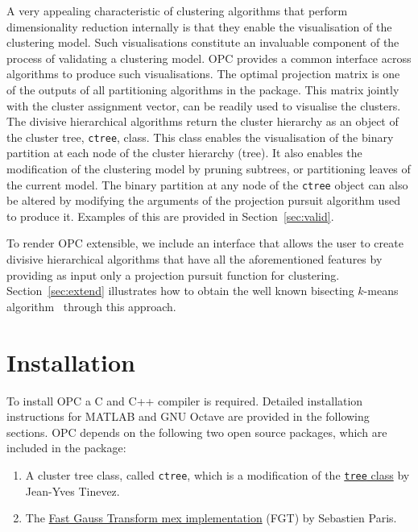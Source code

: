 \documentclass{book}
\begin{document}
A very appealing characteristic of clustering algorithms that perform
dimensionality reduction internally is that they enable the visualisation of
the clustering model. 
%
Such visualisations constitute an invaluable component of the process of
validating a clustering model.  OPC provides a common interface across
algorithms to produce such visualisations.
%
The optimal
projection matrix is one of the outputs of all partitioning algorithms in the
package. This matrix jointly with the cluster assignment vector, can be readily
used to visualise the clusters.
%
The divisive hierarchical algorithms return the cluster hierarchy as an object
of the cluster tree, {\tt ctree}, class.
%
This class enables the visualisation of the binary partition at each
node of the cluster hierarchy (tree). 
%
%
It also enables the modification of the clustering model by pruning subtrees,
or partitioning leaves of the current model.
%
The binary partition at any node of the {\tt ctree} object can also be altered
by modifying the arguments of the projection pursuit algorithm used to produce
it. Examples of this are provided in Section~\ref{sec:valid}.


To render OPC extensible, we include an interface that allows the user to
create divisive hierarchical algorithms that have all the aforementioned
features by providing as input only a projection pursuit function for
clustering. Section~\ref{sec:extend} illustrates how to obtain the well known
bisecting $k$-means algorithm~\cite{SteinbachKK2000} through this approach.



\chapter{Installation}

To install OPC a C and C++ compiler is required. Detailed installation
instructions for MATLAB and GNU Octave are provided in the following sections.
%
OPC depends on the following two open source
packages, which are included in the package:

\begin{enumerate}

\item A cluster tree class, called {\tt ctree}\/, which is a
modification of the
\href{https://uk.mathworks.com/matlabcentral/fileexchange/35623-tree-data-structure-as-a-matlab-class}
{{\tt tree} class} by
Jean-Yves Tinevez.

\item The
\href{https://uk.mathworks.com/matlabcentral/fileexchange/17438-fast-gaussian-transform-mex-implementation}
{Fast Gauss Transform mex implementation} (FGT) by Sebastien Paris.

\end{enumerate}
\end{document}
